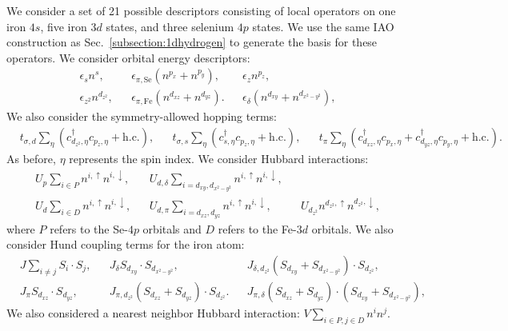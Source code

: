 We consider a set of 21 possible descriptors consisting of local operators on one iron $4s$, five iron $3d$ states, and three selenium $4p$ states.
We use the same IAO construction as Sec.~\ref{subsection:1dhydrogen} to generate the basis for these operators.
We consider orbital energy descriptors: 
\begin{align*}
  &\epsilon_{s} n^s,&
  &\epsilon_{\pi,\mathrm{Se}} (n^{p_x} + n^{p_y}), &
  &\epsilon_{z} n^{p_z},&
  \\
  &\epsilon_{z^2} n^{d_{z^2}},& 
  &\epsilon_{\pi,\mathrm{Fe}} (n^{d_{xz}} + n^{d_{yz}}).& 
  &\epsilon_{\delta} (n^{d_{xy}} + n^{d_{x^2-y^2}}),&
\end{align*}
We also consider the symmetry-allowed hopping terms:
\begin{align*}
  &t_{\sigma,d} \sum_{\eta} \left( c_{d_{z^2},\eta}^{\dagger} c_{p_z,\eta} + \text{h.c.} \right),&
  &t_{\sigma,s} \sum_{\eta} \left(c_{s,\eta}^{\dagger}  c_{p_z,\eta} + \text{h.c.} \right),&
  &t_{\pi} \sum_{\eta} \left(c_{d_{xz},\eta}^{\dagger}  c_{p_x,\eta} + c_{d_{yz},\eta}^{\dagger}  c_{p_y,\eta} + \text{h.c.} \right).&
\end{align*}
As before, $\eta$ represents the spin index.
We consider Hubbard interactions:
\begin{align*}
  &U_p \sum_{i \in P} n^{i,\uparrow} n^{i,\downarrow},&
  &U_{d,\delta} \sum_{i=d_{xy},d_{x^2-y^2}} n^{i,\uparrow} n^{i,\downarrow},&
  \\
  &U_d \sum_{i \in D} n^{i,\uparrow} n^{i,\downarrow},&
  &U_{d,\pi} \sum_{i=d_{xz},d_{yz}} n^{i,\uparrow} n^{i,\downarrow},&
  &U_{d_{z^2}} n^{d_{z^2},\uparrow} n^{d_{z^2},\downarrow},&
\end{align*}
where $P$ refers to the Se-$4p$ orbitals and $D$ refers to the Fe-$3d$ orbitals. 
We also consider Hund coupling terms for the iron atom:
\begin{align*}
  &J \sum_{i\ne j} S_i \cdot S_j,&
  &J_{\delta} S_{d_{xy}} \cdot S_{d_{x^2-y^2}},&
  &J_{\delta,d_{z^2}} (S_{d_{xy}} + S_{d_{x^2-y^2}}) \cdot S_{d_{z^2}},&
  \\
  &J_{\pi} S_{d_{xz}} \cdot S_{d_{yz}},&
  &J_{\pi,d_{z^2}} (S_{d_{xz}} + S_{d_{yz}}) \cdot S_{d_{z^2}}.&
  &J_{\pi,\delta} (S_{d_{xz}} + S_{d_{yz}}) \cdot (S_{d_{xy}} + S_{d_{x^2-y^2}}),&
\end{align*}
We also considered a nearest neighbor Hubbard interaction: $V \sum_{i\in P, j\in D} n^{i} n^j$.

